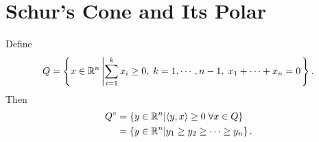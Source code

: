 \documentclass[12pt]{article}
\begin{document}
\section{Schur's Cone and Its Polar}
    \begin{example}
        Define
        \begin{equation}\label{eqn:cone-1}
            Q = \left\lbrace
                x\in \mathbb R^n \left|
                    \sum_{i = 1}^{k} x_i
                    \ge 0, \;
                    k = 1 ,\cdots, n-1, \;
                    x_1 + \cdots + x_n = 0
                \right.
            \right\rbrace.
        \end{equation}
        Then
        \begin{align}
            Q^\circ &= \left\lbrace
               y\in\mathbb R^n |
               \langle y, x\rangle \ge 0 \; \forall x \in Q
            \right\rbrace
            \\
            &=
            \left\lbrace
                y\in\mathbb R^n | y_{1} \ge y_2\ge \cdots  \ge y_n
            \right\rbrace.
        \end{align}
    \end{example}
\end{document}
